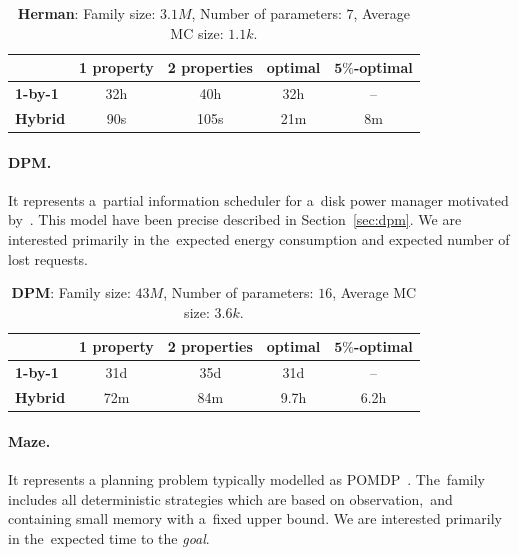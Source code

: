 \begin{table}[h!]
\centering
\begin{tabular}{l|cccc}
    \hline \hline 
    & \multicolumn{1}{l}{\textbf{1 property}} & \multicolumn{1}{l}{\textbf{2 properties}} & \multicolumn{1}{l}{\textbf{optimal}} & \multicolumn{1}{l}{\textbf{$\mathbf{5\%}$-optimal}} \\ \hline
    \textbf{1-by-1} & 32h & 40h & 32h & \,--\, \\
    \textbf{Hybrid} & 90s & 105s & 21m & 8m \\ \hline \hline
\end{tabular}
\caption{\textbf{Herman}: Family size: $3.1M$, Number of parameters: $7$, Average MC size: $1.1k$.}
\end{table}

\paragraph{DPM.}
It represents a~partial information scheduler for a~disk power manager motivated by~\cite{dpm1}.
This model have been precise described in Section~\ref{sec:dpm}.
We are interested primarily in the~expected energy consumption and expected number of lost requests.

\begin{table}[h!]
\centering
\begin{tabular}{l|cccc}
    \hline \hline 
    & \multicolumn{1}{l}{\textbf{1 property}} & \multicolumn{1}{l}{\textbf{2 properties}} & \multicolumn{1}{l}{\textbf{optimal}} & \multicolumn{1}{l}{\textbf{$\mathbf{5\%}$-optimal}} \\ \hline
    \textbf{1-by-1} & 31d & 35d & 31d & \,--\, \\
    \textbf{Hybrid} & 72m & 84m & 9.7h & 6.2h \\ \hline \hline
\end{tabular}
\caption{\textbf{DPM}:  Family size: $43M$, Number of parameters: $16$, Average MC size: $3.6k$.}
\end{table}

\paragraph{Maze.}
It represents a planning problem typically modelled as POMDP~\cite{maze}.
The~family includes all deterministic strategies which are based on observation,~and containing small memory with a~fixed upper bound.
We are interested primarily in the~expected time to the \emph{goal}.

